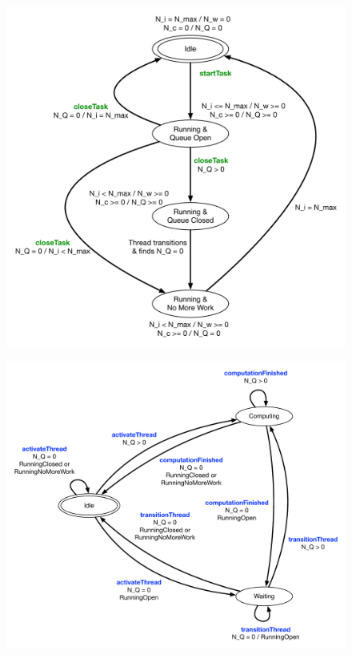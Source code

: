 \documentclass{article}
\begin{document}
\begin{figure}[!ht]
\begin{center}
\includegraphics[width=5.0in]{TeamStates.pdf}
\caption[]{}
\label{fig:TeamStateDiagram}
\end{center}
\end{figure}

\begin{figure}[!hp]
\begin{center}
\includegraphics[width=6.5in]{ThreadStatesPersistent.pdf}
\caption[]{}
\label{fig:ThreadStateDiagram}
\end{center}
\end{figure}
\end{document}

